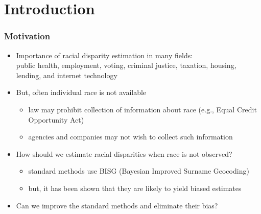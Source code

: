 \documentclass{beamer}
\title[]{\tit}
\institute[Harvard]{\large Harvard University }
\date{Keynote Talk \\ Promises and Limits of Inferring Protected-Class Data\\ for Disparate
Impact Testing of AI Systems\\
  September 8, 2023 \\  \vspace{.25in} Joint work with
  Cory McCartan, Jacob Goldin, and Daniel E. Ho }
\author[Kosuke Imai]{\large Kosuke Imai }
\begin{document}
\frame{\titlepage}



\section{Introduction}

\begin{frame}

  \frametitle{Motivation}

  \begin{itemize}
  \item Importance of racial disparity estimation in many fields:\\
    public health, employment, voting, criminal justice, taxation,
    housing, lending, and internet technology

    \vfill
  \item But, often individual race is not available
    \begin{itemize}
    \item law may prohibit collection of information about race
      (e.g., Equal Credit Opportunity Act)
    \item agencies and companies may not wish to collect such information
    \end{itemize}
    \vfill
  \item How should we estimate racial disparities when race is not
    observed?
    \begin{itemize}
    \item standard methods use BISG (Bayesian Improved Surname
      Geocoding)
    \item but, it has been shown that they are likely to yield biased estimates
    \end{itemize}

  \item Can we improve the standard methods and eliminate their bias? 
  \end{itemize}

\end{frame}
\end{document}

